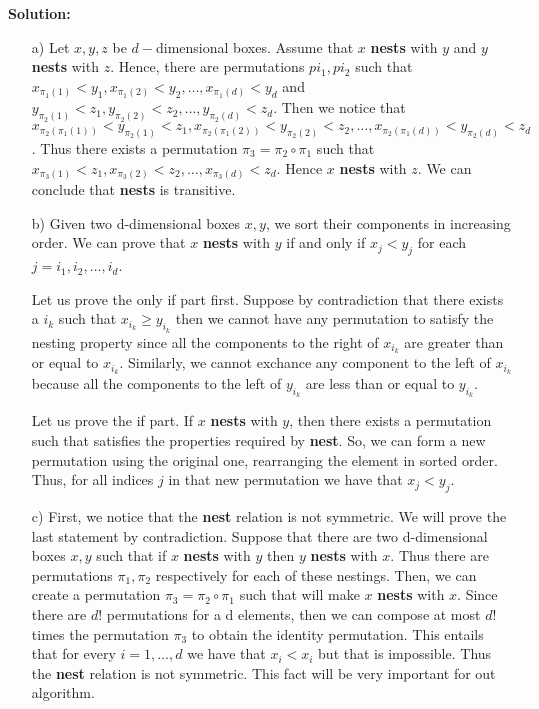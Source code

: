 \documentclass[a4paper, 11pt]{article}
\newcommand{\solution}{\textbf{Solution:}}
\begin{document}
\solution

\begin{itemize}
	\item [a)] Let $x, y, z$ be $d-$dimensional boxes. Assume that $x$ \textbf{nests} with $y$ and $y$ \textbf{nests} with $z$. Hence, there are permutations $pi_1, pi_2$ such that $x_{\pi_1(1)} < y_1, x_{\pi_1(2)} < y_2, \dots, x_{\pi_1(d)} < y_d$ and $y_{\pi_2(1)} < z_1, y_{\pi_2(2)} < z_2, \dots, y_{\pi_2(d)} < z_d$. Then we notice that $x_{\pi_2(\pi_1(1))} < y_{\pi_2(1)} < z_1, x_{\pi_2(\pi_1(2))} < y_{\pi_2(2)} < z_2, \dots, x_{\pi_2(\pi_1(d))} < y_{\pi_2(d)} < z_d$. Thus there exists a permutation $\pi_3 = \pi_2 \circ \pi_1$ such that $x_{\pi_3(1)} < z_1, x_{\pi_3(2)} < z_2, \dots, x_{\pi_3(d)} < z_d$. Hence $x$ \textbf{nests} with $z$. We can conclude that \textbf{nests} is transitive. 

	\item [b)] Given two d-dimensional boxes $x, y$, we sort their components in increasing order. We can prove that $x$ \textbf{nests} with $y$ if and only if $x_j < y_j$ for each $j = i_1, i_2, \dots, i_d$. 

	Let us prove the only if part first. Suppose by contradiction that there exists a $i_k$ such that $x_{i_k} \geq y_{i_k}$ then we cannot have any permutation to satisfy the nesting property since all the components to the right of $x_{i_k}$ are greater than or equal to $x_{i_k}$. Similarly, we cannot exchance any component to the left of $x_{i_k}$ because all the components to the left of $y_{i_k}$ are less than or equal to $y_{i_k}$. 

	Let us prove the if part. If $x$ \textbf{nests} with $y$, then there exists a permutation such that satisfies the properties required by \textbf{nest}. So, we can form a new permutation using the original one, rearranging the element in sorted order. Thus, for all indices $j$ in that new permutation we have that $x_j < y_j$.

	\item [c)] First, we notice that the \textbf{nest} relation is not symmetric. We will prove the last statement by contradiction. Suppose that there are two d-dimensional boxes $x, y$ such that if $x$ \textbf{nests} with $y$ then $y$ \textbf{nests} with $x$. Thus there are permutations $\pi_1, \pi_2$ respectively for each of these nestings. Then, we can create a permutation $\pi_3 = \pi_2 \circ \pi_1$ such that will make $x$ \textbf{nests} with $x$. Since there are $d!$ permutations for a d elements, then we can compose at most $d!$ times the permutation $\pi_3$ to obtain the identity permutation. This entails that for every $i = 1, \dots, d$ we have that $x_i < x_i$ but that is impossible. Thus the \textbf{nest} relation is not symmetric. This fact will be very important for out algorithm. 


\end{itemize}
\end{document}
